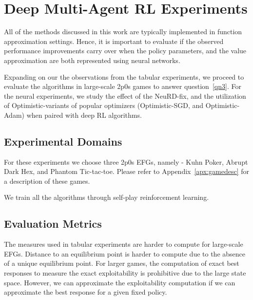\chapter{Deep Multi-Agent RL Experiments}
All of the methods discussed in this work are typically implemented in function approximation
settings.
Hence, it is important to evaluate if the observed performance improvements carry over when the
policy parameters, and the value approximation are both represented using neural networks.

Expanding on our the observations from the tabular experiments, we proceed to evaluate the
algorithms in large-scale 2p0s games to answer question~\ref{qn3}.
For the neural experiments, we study the effect of the NeuRD-fix, and the utilization of
Optimistic-variants of popular optimizers (Optimistic-SGD, and Optimistic-Adam) when paired with
deep RL algorithms.

\section{Experimental Domains}
For these experiments we choose three 2p0s EFGs, namely - Kuhn Poker, Abrupt Dark Hex, and Phantom
Tic-tac-toe.
Please refer to Appendix~\ref{apx:gamedesc} for a description of these games.

We train all the algorithms through self-play reinforcement learning.

\section{Evaluation Metrics}
The measures used in tabular experiments are harder to compute for large-scale EFGs.
Distance to an equilibrium point is harder to compute due to the absence of a unique equilibrium
point.
For larger games, the computation of exact best responses to measure the exact exploitability is
prohibitive due to the large state space.
However, we can approximate the exploitability computation if we can approximate the best response
for a given fixed policy.

